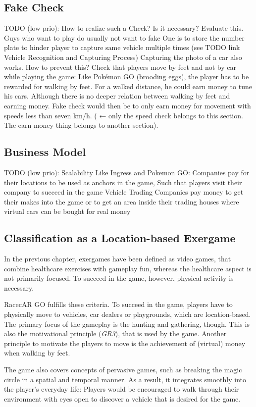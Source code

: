 \subsection{Fake Check}
TODO (low prio):
How to realize such a Check?
Is it necessary? Evaluate this. Guys who want to play do usually not want to fake
One is to store the number plate to hinder player to capture same vehicle multiple times (see TODO link Vehicle Recognition and Capturing Process)
Capturing the photo of a car also works. How to prevent this?
Check that players move by feet and not by car while playing the game: Like Pokémon GO (brooding eggs), the player has to be rewarded for walking by feet. For a walked distance, he could earn money to tune his cars. Although there is no deeper relation between walking by feet and earning money. Fake check would then be to only earn money for movement with speeds less than seven km/h. ( ← only the speed check belongs to this section. The earn-money-thing belongs to another section).

\subsection{Business Model}
TODO (low prio):
Scalability
Like Ingress and Pokemon GO: Companies pay for their locations to be used as anchors in the game, Such that players visit their company to succeed in the game
Vehicle Trading Companies pay money to get their makes into the game or to get an area inside their trading houses where virtual cars can be bought for real money

\subsection{Classification as a Location-based Exergame}
In the previous chapter, exergames have been defined as video games, that combine healthcare exercises with gameplay fun, whereas the healthcare aspect is not primarily focused. To succeed in the game, however, physical activity is necessary.

RacecAR GO fulfills these criteria. To succeed in the game, players have to physically move to vehicles, car dealers or playgrounds, which are location-based. The primary focus of the gameplay is the hunting and gathering, though. This is also the motivational principle (\emph{GR3}), that is used by the game. Another principle to motivate the players to move is the achievement of (virtual) money when walking by feet.

The game also covers concepts of pervasive games, such as breaking the magic circle in a spatial and temporal manner. As a result, it integrates smoothly into the player's everyday life: Players would be encouraged to walk through their environment with eyes open to discover a vehicle that is desired for the game.

